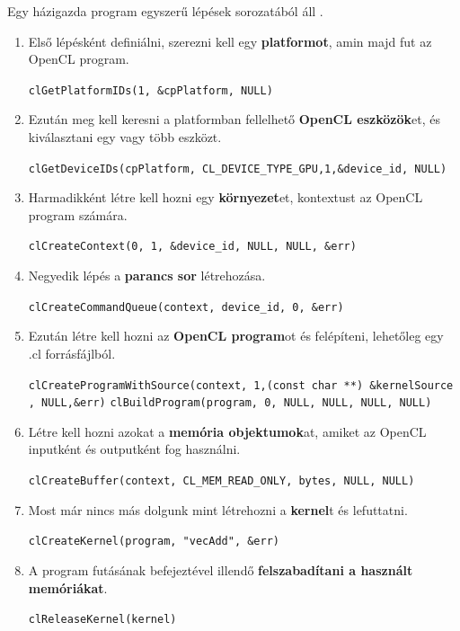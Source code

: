 Egy házigazda program egyszerű lépések sorozatából áll \cite{opencl_host}.

\begin{enumerate}
\item Első lépésként definiálni, szerezni kell egy \textbf{platformot}, amin majd fut az OpenCL program. 

\texttt{clGetPlatformIDs(1, \&cpPlatform, NULL)}
\item Ezután meg kell keresni a platformban fellelhető \textbf{OpenCL eszközök}et, és kiválasztani egy vagy több eszközt.

\texttt{clGetDeviceIDs(cpPlatform, CL\_DEVICE\_TYPE\_GPU,1,\&device\_id, NULL)}
\item Harmadikként létre kell hozni egy \textbf{környezet}et, kontextust az OpenCL program számára.

\texttt{clCreateContext(0, 1, \&device\_id, NULL, NULL, \&err)}
\item Negyedik lépés a \textbf{parancs sor} létrehozása.

\texttt{clCreateCommandQueue(context, device\_id, 0, \&err)}
\item Ezután létre kell hozni az \textbf{OpenCL program}ot és felépíteni, lehetőleg egy .cl forrásfájlból.

\texttt{clCreateProgramWithSource(context, 1,(const char **) \&kernelSource\\ , NULL,\&err)}
\newline
\texttt{clBuildProgram(program, 0, NULL, NULL, NULL, NULL)}
\item Létre kell hozni azokat a \textbf{memória objektumok}at, amiket az OpenCL inputként és outputként fog használni.

\texttt{clCreateBuffer(context, CL\_MEM\_READ\_ONLY, bytes, NULL, NULL)}
\item Most már nincs más dolgunk mint létrehozni a \textbf{kernel}t és lefuttatni.

\texttt{clCreateKernel(program, "vecAdd", \&err)}
\item A program futásának befejeztével illendő \textbf{felszabadítani a használt memóriákat}.

\texttt{clReleaseKernel(kernel)}
\end{enumerate}
	
